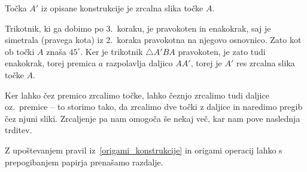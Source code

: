 \begin{trditev}
    Točka $A'$ iz opisane konstrukcije je zrcalna slika točke $A$.
\end{trditev}

\begin{dokaz}
    Trikotnik, ki ga dobimo po 3.\ koraku, je pravokoten in enakokrak, saj je simetrala (pravega kota) iz 2.\ koraka pravokotna na njegovo osnovnico. Zato kot ob točki $A$ znaša $45^{\circ}$. Ker je trikotnik $\triangle A'BA$ pravokoten, je zato tudi enakokrak, torej premica $a$ razpolavlja daljico $AA'$, torej je $A'$ res zrcalna slika točke $A$.
\end{dokaz}

Ker lahko čez premico zrcalimo točke, lahko čeznjo zrcalimo tudi daljice oz.\ premice -- to storimo tako, da zrcalimo dve točki z daljice in naredimo pregib čez njuni sliki. Zrcaljenje pa nam omogoča še nekaj več, kar nam pove naslednja trditev.


\begin{trditev}
    \label{trd:prenasanje_razdalj}
    Z upoštevanjem pravil iz~\ref{origami_konstrukcije} in origami operacij lahko s prepogibanjem papirja prenašamo razdalje.
\end{trditev}

